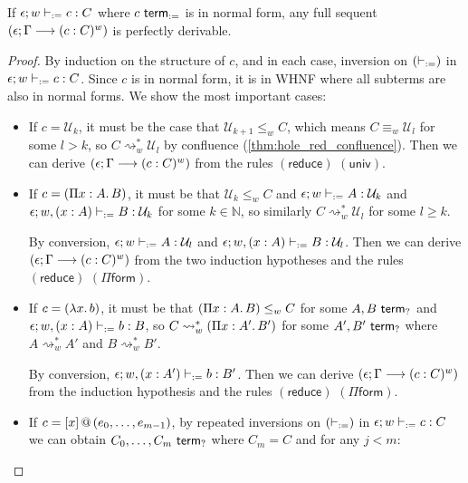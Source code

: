 \documentclass[twoside]{report}
\begin{document}
\begin{proposition}
\label{thm:focused_calculus_completeness}
If $\epsilon; w \vdash_{:=} c : C$ where $c \ \mathsf{term}_{:=}$ is in normal form, any full sequent $(\epsilon; \Gamma \longrightarrow (c : C)^w)$ is perfectly derivable.
\end{proposition}

\begin{proof}
By induction on the structure of $c$, and in each case, inversion on $(\vdash_{:=})$ in $\epsilon; w \vdash_{:=} c : C$. Since $c$ is in normal form, it is in WHNF where all subterms are also in normal forms. We show the most important cases:

\begin{itemize}
    \item If $c = \mathcal U_k$, it must be the case that $\mathcal U_{k + 1} \leq_w C$, which means $C \equiv_w \mathcal U_l$ for some $l > k$, so $C \rightsquigarrow_w^\ast \mathcal U_l$ by confluence (\cref{thm:hole_red_confluence}). Then we can derive $(\epsilon; \Gamma \longrightarrow (c : C)^w)$ from the rules $(\mathsf{reduce})$ $(\mathsf{univ})$.

    \item If $c = (\Pi{x} : {A}.\,{B})$, it must be that $\mathcal U_k \leq_w C$ and $\epsilon; w \vdash_{:=} A : \mathcal U_k$ and $\epsilon; w, (x : A) \vdash_{:=} B : \mathcal U_k$ for some $k \in \mathbb N$, so similarly $C \rightsquigarrow^\ast_w \mathcal U_l$ for some $l \geq k$.

    By conversion, $\epsilon; w \vdash_{:=} A : \mathcal U_l$ and $\epsilon; w, (x : A) \vdash_{:=} B : \mathcal U_l$. Then we can derive $(\epsilon; \Gamma \longrightarrow (c : C)^w)$ from the two induction hypotheses and the rules $(\mathsf{reduce})$ $(\Pi\mathsf{form})$.

    \item If $c = (\lambda{x}.\,{b})$, it must be that $(\Pi{x} : {A}.\,{B}) \leq_w C$ for some $A, B \ \mathsf{term}_{?}$ and $\epsilon; w, (x : A) \vdash_{:=} b : B$, so $C \rightsquigarrow^\ast_w (\Pi{x} : {A'}.\,{B'})$ for some $A', B' \ \mathsf{term}_{?}$ where $A \rightsquigarrow^\ast_w A'$ and $B \rightsquigarrow^\ast_w B'$.

    By conversion, $\epsilon; w, (x : A') \vdash_{:=} b : B'$. Then we can derive $(\epsilon; \Gamma \longrightarrow (c : C)^w)$ from the induction hypothesis and the rules $(\mathsf{reduce})$ $(\Pi\mathsf{form})$.

    \item If $c = {[x]}\,@\,({e_0, \ldots, e_{m-1}})$, by repeated inversions on $(\vdash_{:=})$ in $\epsilon; w \vdash_{:=} c : C$ we can obtain $C_0, \ldots, C_m \ \mathsf{term}_{?}$ where $C_m = C$ and for any $j < m$:


\end{itemize}
\end{proof}
\end{document}
